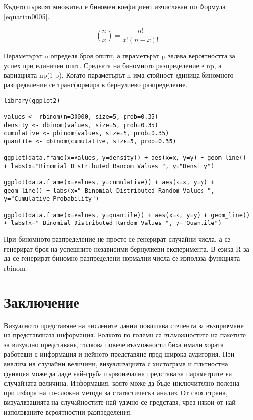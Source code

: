 Където първият множител е биномен коефициент изчисляван по Формула \ref{equation0005}.

\begin{equation}
\binom{n}{x} = \frac{n!}{x!(n-x)!}
\label{equation0005}
\end{equation}

Параметърът n определя броя опити, а параметърът p задава вероятността за успех при единичен опит. Средната на биномното разпределение е np, а вариацията np(1-p). Когато параметърът n има стойност единица биномното разпределение се трансформира в бернулиево разпределение. 

\begin{lstlisting}[caption=Биномно разпределение, label=listing0158]
library(ggplot2)

values <- rbinom(n=30000, size=5, prob=0.35)
density <- dbinom(values, size=5, prob=0.35)
cumulative <- pbinom(values, size=5, prob=0.35)
quantile <- qbinom(cumulative, size=5, prob=0.35)

ggplot(data.frame(x=values, y=density)) + aes(x=x, y=y) + geom_line() + labs(x="Binomial Distributed Random Values ", y="Density")

ggplot(data.frame(x=values, y=cumulative)) + aes(x=x, y=y) + geom_line() + labs(x=" Binomial Distributed Random Values ", y="Cumulative Probability")

ggplot(data.frame(x=values, y=quantile)) + aes(x=x, y=y) + geom_line() + labs(x=" Binomial Distributed Random Values ", y="Quantile")
\end{lstlisting}

При биномното разпределение не просто се генерират случайни числа, а се генерират броя на успешните независими бернулиеви експеримента. В езика R за да се генерират биномно разпределени нормални числа се използва функцията rbinom.

\section*{Заключение}

Визуалното представяне на числените данни повишава степента за възприемане на представяната информация. Колкото по-големи са възможностите на пакетите за визуално представяне, толкова повече възможности биха имали хората работещи с информация и нейното представяне пред широка аудитория. При анализа на случайни величини, визуализацията с хистограма и плътностна функция може да даде най-груба първоначална представа за параметрите на случайната величина. Информация, която може да бъде изключително полезна при избора на по-сложни методи за статистически анализ. От своя страна, визуализацията на случайностите най-удачно се представя, чрез някои от най-използваните вероятностни разпределения. 


